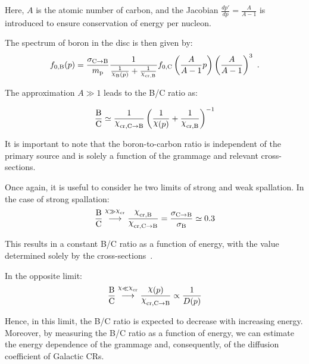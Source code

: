 Here, $A$ is the atomic number of carbon, and the Jacobian $\frac{dp'}{dp} = \frac{A}{A-1}$ is introduced to ensure conservation of energy per nucleon.

The spectrum of boron in the disc is then given by:
%
\begin{equation}
f_{0,\rm B}(p) 
= \frac{\sigma_{\rm C \rightarrow B}}{m_{\rm p}}  \frac{1}{\frac{1}{\rchi_{\rm B}(p)} + \frac{1}{\rchi_{\rm cr, B}}} f_{0, \rm C}\left(\frac{A}{A-1}p\right) \left(\frac{A}{A-1} \right)^3~.
\end{equation}

The approximation \( A \gg 1 \) leads to the B/C ratio as:
%
\begin{remark}
\begin{equation}
\frac{\rm B}{\rm C} \simeq \frac{1}{\rchi_{\rm cr, C\rightarrow B}} \left(\frac{1}{\rchi(p)} + \frac{1}{\rchi_{\rm cr, B}}\right)^{-1}
\label{eq:chibc}
\end{equation}
\end{remark}

It is important to note that the boron-to-carbon ratio is independent of the primary source and is solely a function of the grammage and relevant cross-sections.

Once again, it is useful to consider he two limits of strong and weak spallation. 
%
In the case of strong spallation:
%
\begin{equation}
\frac{\rm B}{\rm C} \oset{\rchi \gg \rchi_{\rm cr}}{\, \longrightarrow \,} \frac{\rchi_{\rm cr, B}}{\rchi_{\rm cr, C\rightarrow B}} 
= \frac{\sigma_{\rm C \rightarrow B}}{\sigma_{\rm B}} 
\simeq 0.3
\end{equation}

This results in a constant B/C ratio as a function of energy, with the value determined solely by the cross-sections~\cite{Evoli2019prd}.

In the opposite limit:
%
\begin{equation}
\frac{\rm B}{\rm C} \oset{\rchi \ll \rchi_{\rm cr}}{\, \longrightarrow \,} \frac{\rchi(p)}{\rchi_{\rm cr, C\rightarrow B}} \propto \frac{1}{D(p)}
\label{eq:bchene}
\end{equation}

Hence, in this limit, the B/C ratio is expected to decrease with increasing energy. 
%
Moreover, by measuring the B/C ratio as a function of energy, we can estimate the energy dependence of the grammage and, consequently, of the diffusion coefficient of Galactic CRs.

